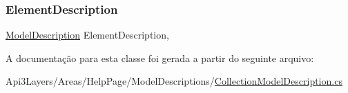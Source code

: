 \subsubsection{\texorpdfstring{Element\+Description}{ElementDescription}}
{\footnotesize\ttfamily \hyperlink{classApi3Layers_1_1Areas_1_1HelpPage_1_1ModelDescriptions_1_1ModelDescription}{Model\+Description} Element\+Description\hspace{0.3cm}{\ttfamily [get]}, {\ttfamily [set]}}



A documentação para esta classe foi gerada a partir do seguinte arquivo\+:\begin{DoxyCompactItemize}
\item 
Api3\+Layers/\+Areas/\+Help\+Page/\+Model\+Descriptions/\hyperlink{CollectionModelDescription_8cs}{Collection\+Model\+Description.\+cs}\end{DoxyCompactItemize}
